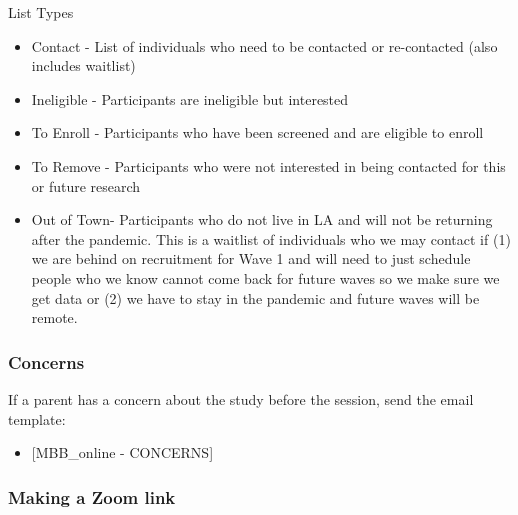 \documentclass[]{book}
\providecommand{\tightlist}{%
  \setlength{\itemsep}{0pt}\setlength{\parskip}{0pt}}
\begin{document}
List Types

\begin{itemize}
\tightlist
\item
  Contact - List of individuals who need to be contacted or re-contacted (also includes waitlist)
\item
  Ineligible - Participants are ineligible but interested
\item
  To Enroll - Participants who have been screened and are eligible to enroll
\item
  To Remove - Participants who were not interested in being contacted for this or future research
\item
  Out of Town- Participants who do not live in LA and will not be returning after the pandemic. This is a waitlist of individuals who we may contact if (1) we are behind on recruitment for Wave 1 and will need to just schedule people who we know cannot come back for future waves so we make sure we get data or (2) we have to stay in the pandemic and future waves will be remote.
\end{itemize}

\hypertarget{concerns}{%
\subsubsection{Concerns}\label{concerns}}

If a parent has a concern about the study before the session, send the email template:

\begin{itemize}
\tightlist
\item
  {[}MBB\_online - CONCERNS{]}
\end{itemize}

\hypertarget{making-a-zoom-link}{%
\subsubsection{Making a Zoom link}\label{making-a-zoom-link}}
\end{document}
